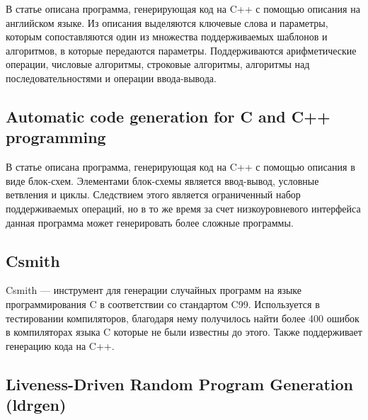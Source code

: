 В статье \cite{pg-eli} описана программа, генерирующая код на C++ с помощью описания на английском языке.
Из описания выделяются ключевые слова и параметры, которым сопоставляются один из множества поддерживаемых шаблонов и алгоритмов, в которые передаются параметры.
Поддерживаются арифметические операции, числовые алгоритмы, строковые алгоритмы, алгоритмы над последовательностями и операции ввода-вывода.


\subsection{Automatic code generation for C and C++ programming}

В статье \cite{acg-2021} описана программа, генерирующая код на C++ с помощью описания в виде блок-схем.
Элементами блок-схемы является ввод-вывод, условные ветвления и циклы.
Следствием этого является ограниченный набор поддерживаемых операций,
но в то же время за счет низкоуровневого интерфейса данная программа может генерировать более сложные программы.

\subsection{Csmith}

Csmith --- инструмент для генерации случайных программ на языке программирования C в соответствии со стандартом C99.
Используется в тестировании компиляторов, благодаря нему получилось найти более 400 ошибок в компиляторах языка C которые не были известны до этого.
Также поддерживает генерацию кода на C++. \cite{csmith}
% 


\subsection{Liveness-Driven Random Program Generation (ldrgen)}

